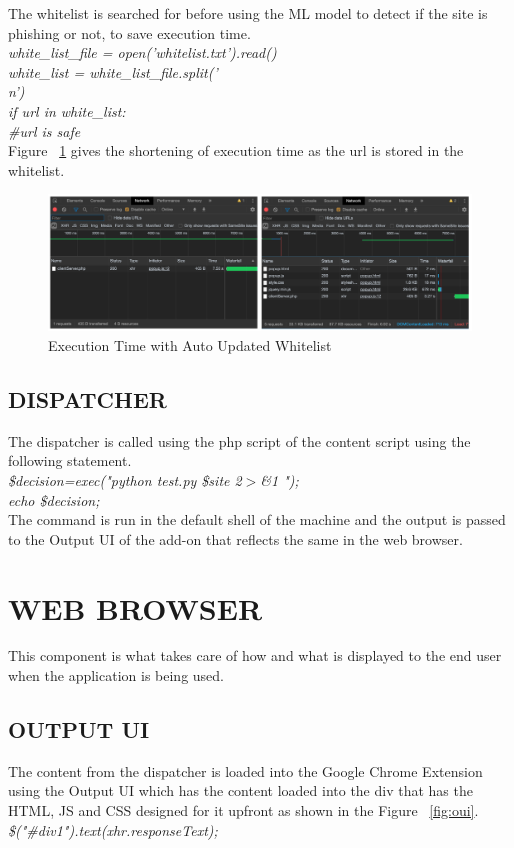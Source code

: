 The whitelist is searched for before using the ML model to detect if the site is phishing or not, to save execution time.\\
\null\quad\textit{white\_list\_file = open('whitelist.txt').read()}\\
\null\quad\textit{white\_list = white\_list\_file.split('\\n')}\\
\null\quad\textit{if url in white\_list:}\\
\null\quad\textit{\#url is safe}\\

Figure  ~\ref{fig:etauw} gives the shortening of execution time as the url is stored in the whitelist.

\begin{figure}[htp]
\centering
\includegraphics[scale=0.5]{Figures/image12.png}
\caption{Execution Time with Auto Updated Whitelist}
\label{fig:etauw}
\end{figure}

\subsection{DISPATCHER}
The dispatcher is called using the php script of the content script using the following statement.\\
\null\quad\textit{\$decision=exec("python test.py \$site 2$>$\&1 ");}\\
\null\quad\textit{echo \$decision;}\\

The command is run in the default shell of the machine and the output is passed to the Output UI of the add-on that reflects the same in the web browser.

\section{WEB BROWSER}
This component is what takes care of how and what is displayed to the end user when the application is being used.

\subsection{OUTPUT UI}
The content from the dispatcher is loaded into the Google Chrome Extension using the Output UI which has the content loaded into the div that has the HTML, JS and CSS designed for it upfront as shown in the Figure ~\ref{fig:oui}.\\
\null\quad\textit{\$("\#div1").text(xhr.responseText);}\\

